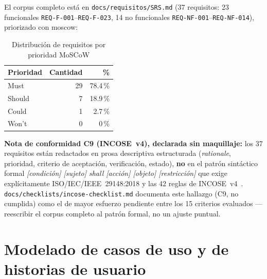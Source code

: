 El corpus completo está en \texttt{docs/requisitos/SRS.md} (37
requisitos: 23 funcionales \texttt{REQ-F-001}--\texttt{REQ-F-023}, 14 no
funcionales \texttt{REQ-NF-001}--\texttt{REQ-NF-014}), priorizado con
\gls{moscow}:

\begin{table}[H]
\centering
\caption{Distribución de requisitos por prioridad MoSCoW}
\label{tab:moscow}
\begin{tabular}{@{}lrr@{}}
\toprule
\textbf{Prioridad} & \textbf{Cantidad} & \textbf{\%} \\
\midrule
Must  & 29 & 78.4\,\% \\
Should &  7 & 18.9\,\% \\
Could &  1 &  2.7\,\% \\
Won't &  0 &  0\,\% \\
\bottomrule
\end{tabular}
\end{table}

\textbf{Nota de conformidad C9 (INCOSE~v4), declarada sin maquillaje:} los
37 requisitos están redactados en prosa descriptiva estructurada
(\emph{rationale}, prioridad, criterio de aceptación, verificación,
estado), \textbf{no} en el patrón sintáctico formal \emph{[condición]
[sujeto] shall [acción] [objeto] [restricción]} que exige explícitamente
ISO/IEC/IEEE~29148:2018 y las 42 reglas de
INCOSE~v4~\cite{ISO29148,INCOSE2023}.
\texttt{docs/checklists/incose-checklist.md} documenta este hallazgo (C9,
no cumplida) como el de mayor esfuerzo pendiente entre los 15 criterios
evaluados --- reescribir el corpus completo al patrón formal, no un
ajuste puntual.

\section{Modelado de casos de uso y de historias de usuario}

